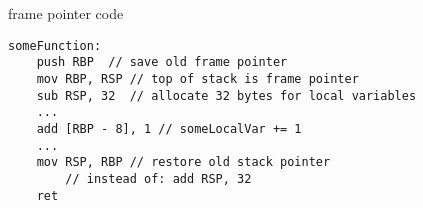 \begin{frame}[fragile,label=framePointerCode]{frame pointer code}
    \lstset{language=myasm}
\begin{lstlisting}
someFunction:
    push RBP  // save old frame pointer
    mov RBP, RSP // top of stack is frame pointer
    sub RSP, 32  // allocate 32 bytes for local variables
    ...
    add [RBP - 8], 1 // someLocalVar += 1
    ...
    mov RSP, RBP // restore old stack pointer
        // instead of: add RSP, 32
    ret
\end{lstlisting}
\end{frame}
